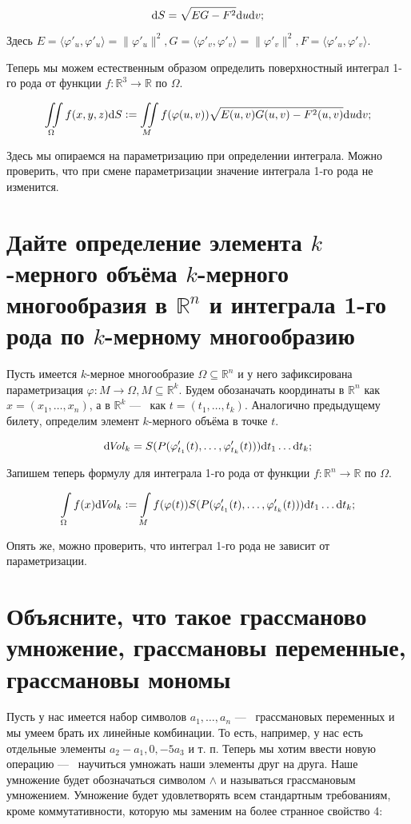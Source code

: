 \documentclass{article}
\begin{document}
	\[ \mathrm{d} S = \sqrt{EG - F^2}\mathrm{d} u \mathrm{d} v; \]
	
	Здесь $E = \langle \varphi'_u, \varphi'_u \rangle = \| \varphi'_u \|^2, G = \langle \varphi'_v, \varphi'_v \rangle = \| \varphi'_v \|^2, F = \langle \varphi'_u, \varphi'_v \rangle$. 

	Теперь мы можем естественным образом определить поверхностный интеграл 1-го рода от функции $f:\mathbb{R}^3 \to \mathbb{R}$ по $\Omega$.

	\[ \iint\limits_\Omega f(x, y, z) \mathrm{d} S := \iint\limits_M f(\varphi(u, v)) \sqrt{E(u, v)G(u, v) - F^2(u, v)} \mathrm{d} u \mathrm{d} v; \]

	Здесь мы опираемся на параметризацию при определении интеграла. Можно проверить, что при смене параметризации значение интеграла 1-го рода не изменится. 

	\section{Дайте определение элемента $k$-мерного объёма $k$-мерного многообразия в $\mathbb{R}^n$ и интеграла 1-го рода по $k$-мерному многообразию}

	Пусть имеется $k$-мерное многообразие $\Omega \subseteq \mathbb{R}^n$ и у него зафиксирована параметризация $\varphi: M \to \Omega, M \subseteq \mathbb{R}^k$. Будем обозаначать координаты в $\mathbb{R}^n$ как $x = (x_1, \ldots, x_n)$, а в $\mathbb{R}^k$ ---~ как $t = (t_1, \ldots, t_k)$. Аналогично предыдущему билету, определим элемент $k$-мерного объёма в точке $t$.

	\[ \mathrm{d} \! \mathit{Vol}_k = S(P(\varphi'_{t_1}(t), \ldots, \varphi'_{t_k}(t))) \mathrm{d} t_1 \ldots \mathrm{d} t_k; \]

	Запишем теперь формулу для интеграла 1-го рода от функции $f:\mathbb{R}^n \to \mathbb{R}$ по $\Omega$.

	\[ \int\limits_\Omega f(x) \mathrm{d} \! \mathit{Vol}_k := \int\limits_M f(\varphi(t))S(P(\varphi'_{t_1}(t), \ldots, \varphi'_{t_k}(t))) \mathrm{d} t_1 \ldots \mathrm{d} t_k;  \]

	Опять же, можно проверить, что интеграл 1-го рода не зависит от параметризации.

	\section{Объясните, что такое грассманово умножение, грассмановы переменные, грассмановы мономы}

	Пусть у нас имеется набор символов $a_1, \ldots, a_n$ ---~ грассмановых переменных и мы умеем брать их линейные комбинации. То есть, например, у нас есть отдельные элементы $a_2 - a_1, 0, -5a_3$ и т. п. Теперь мы хотим ввести новую операцию ---~ научиться умножать наши элементы друг на друга. Наше умножение будет обозначаться символом $\land$ и называться грассмановым умножением. Умножение будет удовлетворять всем стандартным требованиям, кроме коммутативности, которую мы заменим на более странное свойство 4:
\end{document}
